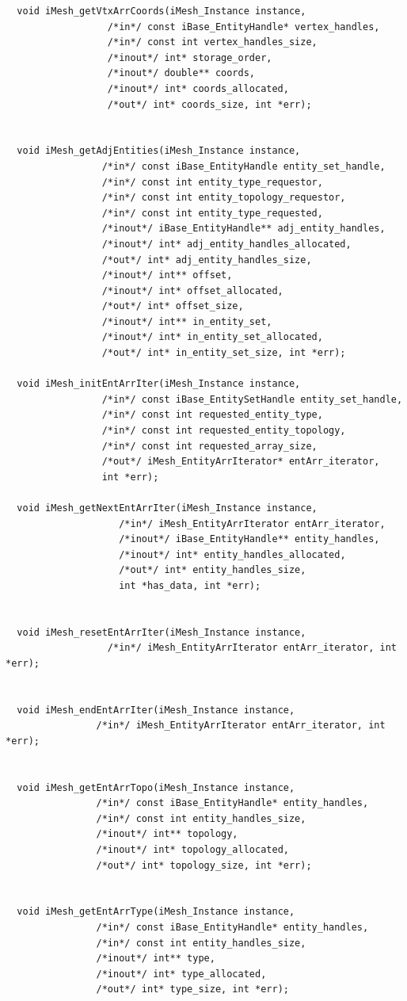 \documentclass{article}
\begin{document}
\begin{small}
\begin{verbatim}
  void iMesh_getVtxArrCoords(iMesh_Instance instance,
				  /*in*/ const iBase_EntityHandle* vertex_handles,
				  /*in*/ const int vertex_handles_size,
				  /*inout*/ int* storage_order,
				  /*inout*/ double** coords,
				  /*inout*/ int* coords_allocated,
				  /*out*/ int* coords_size, int *err);


  void iMesh_getAdjEntities(iMesh_Instance instance,
				 /*in*/ const iBase_EntityHandle entity_set_handle,
				 /*in*/ const int entity_type_requestor,
				 /*in*/ const int entity_topology_requestor,
				 /*in*/ const int entity_type_requested,
				 /*inout*/ iBase_EntityHandle** adj_entity_handles,
				 /*inout*/ int* adj_entity_handles_allocated,
				 /*out*/ int* adj_entity_handles_size,
				 /*inout*/ int** offset,
				 /*inout*/ int* offset_allocated,
				 /*out*/ int* offset_size,
				 /*inout*/ int** in_entity_set,
				 /*inout*/ int* in_entity_set_allocated,
				 /*out*/ int* in_entity_set_size, int *err);

  void iMesh_initEntArrIter(iMesh_Instance instance,
				 /*in*/ const iBase_EntitySetHandle entity_set_handle,
				 /*in*/ const int requested_entity_type,
				 /*in*/ const int requested_entity_topology,
				 /*in*/ const int requested_array_size,
				 /*out*/ iMesh_EntityArrIterator* entArr_iterator,
				 int *err);

  void iMesh_getNextEntArrIter(iMesh_Instance instance,
				    /*in*/ iMesh_EntityArrIterator entArr_iterator,
				    /*inout*/ iBase_EntityHandle** entity_handles,
				    /*inout*/ int* entity_handles_allocated,
				    /*out*/ int* entity_handles_size,
				    int *has_data, int *err);


  void iMesh_resetEntArrIter(iMesh_Instance instance,
				  /*in*/ iMesh_EntityArrIterator entArr_iterator, int *err);


  void iMesh_endEntArrIter(iMesh_Instance instance,
				/*in*/ iMesh_EntityArrIterator entArr_iterator, int *err);


  void iMesh_getEntArrTopo(iMesh_Instance instance,
				/*in*/ const iBase_EntityHandle* entity_handles,
				/*in*/ const int entity_handles_size,
				/*inout*/ int** topology,
				/*inout*/ int* topology_allocated,
				/*out*/ int* topology_size, int *err);


  void iMesh_getEntArrType(iMesh_Instance instance,
				/*in*/ const iBase_EntityHandle* entity_handles,
				/*in*/ const int entity_handles_size,
				/*inout*/ int** type,
				/*inout*/ int* type_allocated,
				/*out*/ int* type_size, int *err);



\end{verbatim}
\end{small}
\end{document}
